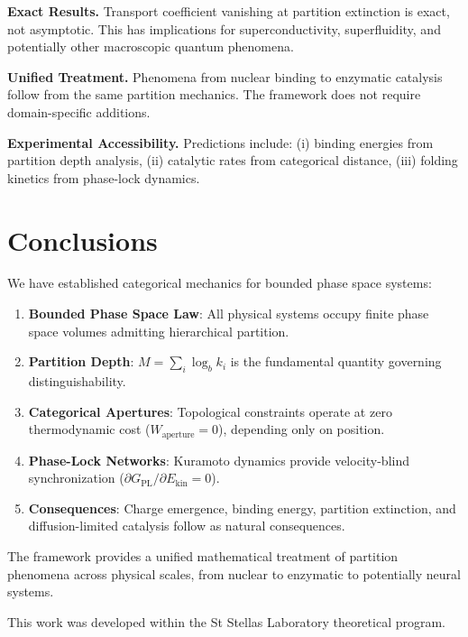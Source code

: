 \documentclass[twocolumn,amsmath,amssymb,aps,prl,superscriptaddress]{revtex4-2}
\newcommand{\Mpart}{M}
\newcommand{\Gfree}{G_{\text{PL}}}
\newcommand{\Ekin}{E_{\text{kin}}}
\newcommand{\Wapert}{W_{\text{aperture}}}
\begin{document}
\textbf{Exact Results.} Transport coefficient vanishing at partition extinction is exact, not asymptotic. This has implications for superconductivity, superfluidity, and potentially other macroscopic quantum phenomena.

\textbf{Unified Treatment.} Phenomena from nuclear binding to enzymatic catalysis follow from the same partition mechanics. The framework does not require domain-specific additions.

\textbf{Experimental Accessibility.} Predictions include: (i) binding energies from partition depth analysis, (ii) catalytic rates from categorical distance, (iii) folding kinetics from phase-lock dynamics.

\section{Conclusions}

We have established categorical mechanics for bounded phase space systems:

\begin{enumerate}
\item \textbf{Bounded Phase Space Law}: All physical systems occupy finite phase space volumes admitting hierarchical partition.

\item \textbf{Partition Depth}: $\Mpart = \sum_i \log_b k_i$ is the fundamental quantity governing distinguishability.

\item \textbf{Categorical Apertures}: Topological constraints operate at zero thermodynamic cost ($\Wapert = 0$), depending only on position.

\item \textbf{Phase-Lock Networks}: Kuramoto dynamics provide velocity-blind synchronization ($\partial \Gfree / \partial \Ekin = 0$).

\item \textbf{Consequences}: Charge emergence, binding energy, partition extinction, and diffusion-limited catalysis follow as natural consequences.
\end{enumerate}

The framework provides a unified mathematical treatment of partition phenomena across physical scales, from nuclear to enzymatic to potentially neural systems.

\begin{acknowledgments}
This work was developed within the St Stellas Laboratory theoretical program.
\end{acknowledgments}


\end{document}
